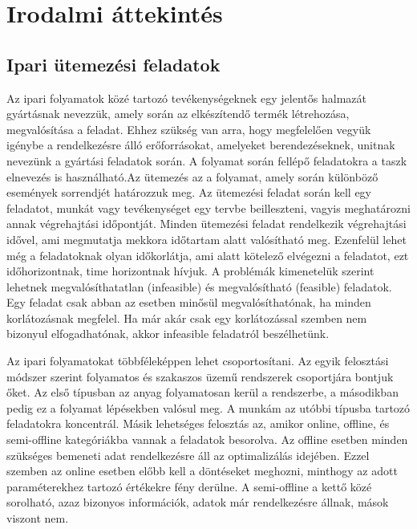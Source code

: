 \chapter{Irodalmi áttekintés}
\section{Ipari ütemezési feladatok}
Az ipari folyamatok közé tartozó tevékenységeknek egy jelentős halmazát gyártásnak nevezzük, amely során az elkészítendő termék létrehozása, megvalósítása a feladat. Ehhez szükség van arra, hogy megfelelően vegyük igénybe a rendelkezésre álló erőforrásokat, amelyeket berendezéseknek, unitnak nevezünk a gyártási feladatok során. A folyamat során fellépő feladatokra a taszk elnevezés is használható.Az ütemezés az a folyamat, amely során különböző események sorrendjét határozzuk meg. Az ütemezési feladat során kell egy feladatot, munkát vagy tevékenységet egy tervbe beilleszteni, vagyis meghatározni annak végrehajtási időpontját. Minden ütemezési feladat rendelkezik végrehajtási idővel, ami megmutatja mekkora időtartam alatt valósítható meg. Ezenfelül lehet még a feladatoknak olyan időkorlátja, ami alatt kötelező elvégezni a feladatot, ezt időhorizontnak, time horizontnak hívjuk. A problémák kimenetelük szerint lehetnek megvalósíthatatlan (infeasible) és megvalósítható (feasible) feladatok. Egy feladat csak abban az esetben minősül megvalósíthatónak, ha minden korlátozásnak megfelel. Ha már akár csak egy korlátozással szemben nem bizonyul elfogadhatónak, akkor infeasible feladatról beszélhetünk.

Az ipari folyamatokat többféleképpen lehet csoportosítani. Az egyik felosztási módszer szerint folyamatos és szakaszos üzemű rendszerek csoportjára bontjuk őket. Az első típusban az anyag folyamatosan kerül a rendszerbe, a másodikban pedig ez a folyamat lépésekben valósul meg. A munkám az utóbbi típusba tartozó feladatokra koncentrál. Másik lehetséges felosztás az, amikor online, offline, és semi-offline kategóriákba vannak a feladatok besorolva. Az offline esetben minden szükséges bemeneti adat rendelkezésre áll az optimalizálás idejében. Ezzel szemben az online esetben előbb kell a döntéseket meghozni, minthogy az adott paraméterekhez tartozó értékekre fény derülne. A semi-offline a kettő közé sorolható, azaz bizonyos információk, adatok már rendelkezésre állnak, mások viszont nem. 

